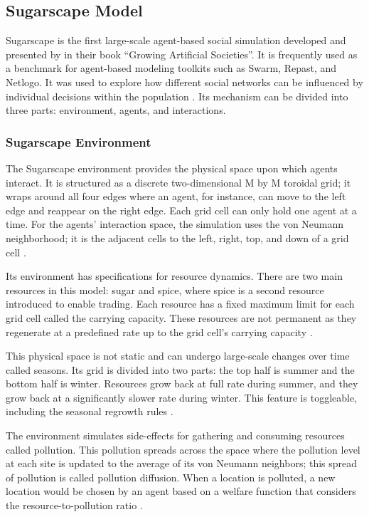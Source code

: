 \documentclass{icsthesis}
\begin{document}
\begin{mainmatter}
\subsection{Sugarscape Model}
Sugarscape is the first large-scale agent-based social simulation developed and presented by \citet{EpsteinAxtell1996} in their  book “Growing Artificial Societies”. It is frequently used as a benchmark for agent-based modeling toolkits such as Swarm, Repast, and Netlogo. It was used to explore how different social networks can be influenced by individual decisions within the population \citep{Kehoe2015}. Its mechanism can be divided into three parts: environment, agents, and interactions.

\subsubsection{Sugarscape Environment}	
The Sugarscape environment provides the physical space upon which agents interact. It is structured as a discrete two-dimensional M by M toroidal grid; it wraps around all four edges where an agent, for instance, can move to the left edge and reappear on the right edge. Each grid cell can only hold one agent at a time. For the agents' interaction space, the simulation uses the von Neumann neighborhood; it is the adjacent cells to the left, right, top, and down of a grid cell \citep{Kehoe2015}. 

Its environment has specifications for resource dynamics. There are two main resources in this model: sugar and spice, where spice is a second resource introduced to enable trading. Each resource has a fixed maximum limit for each grid cell called the carrying capacity. These resources are not permanent as they regenerate at a predefined rate up to the grid cell's carrying capacity \citep{Kehoe2015}. 

This physical space is not static and can undergo large-scale changes over time called seasons. Its grid is divided into two parts: the top half is summer and the bottom half is winter. Resources grow back at full rate during summer, and they grow back at a significantly slower rate during winter. This feature is toggleable, including the seasonal regrowth rules \citep{Kehoe2015}. 

The environment simulates side-effects for gathering and consuming resources called pollution. This pollution spreads across the space where the pollution level at each site is updated to the average of its von Neumann neighbors; this spread of pollution is called pollution diffusion. When a location is polluted, a new location would be chosen by an agent based on a welfare function that considers the resource-to-pollution ratio \citep{Kehoe2015}. 

\end{mainmatter}
\end{document}
